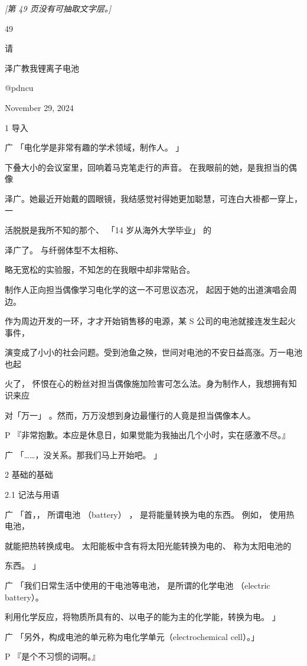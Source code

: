 \noindent\textit{[第 49 页没有可抽取文字层。]}\par

49\par
请\par
泽广教我锂离子电池\par
@pdncu\par
November 29, 2024\par
1 导入\par
广 「电化学是非常有趣的学术领域，制作人。 」\par
下叠大小的会议室里，回响着马克笔走行的声音。 在我眼前的她，是我担当的偶像\par
泽广。她最近开始戴的圆眼镜，我结感觉衬得她更加聪慧，可连白大褂都一穿上，一\par
活脱脱是我所不知的那个、 「14 岁从海外大学毕业」 的\par
泽广了。 与纤弱体型不太相称、\par
略无宽松的实验服，不知怎的在我眼中却非常贴合。\par
制作人正向担当偶像学习电化学的这一不可思议态况， 起因于她的出道演唱会周边。\par
作为周边开发的一环，才才开始销售移的电源，某 S 公司的电池就接连发生起火事件，\par
演变成了小小的社会问题。受到池鱼之殃，世间对电池的不安日益高涨。万一电池也起\par
火了， 怀恨在心的粉丝对担当偶像施加险害可怎么法。身为制作人，我想拥有知识来应\par
对「万一」 。然而，万万没想到身边最懂行的人竟是担当偶像本人。\par
P 『非常抱歉。本应是休息日，如果觉能为我抽出几个小时，实在感激不尽。』\par
广 「……，没关系。那我们马上开始吧。 」\par
2 基础的基础\par
2.1 记法与用语\par
广 「首，， 所谓电池 （battery） ， 是将能量转换为电的东西。 例如， 使用热电池，\par
就能把热转换成电。 太阳能板中含有将太阳光能转换为电的、 称为太阳电池的\par
东西。 」\par
广 「我们日常生活中使用的干电池等电池， 是所谓的化学电池 （electric battery）。\par
利用化学反应，将物质所具有的、以电子的能为主的化学能，转换为电。 」\par
广 「另外，构成电池的单元称为电化学单元（electrochemical cell）。」\par
P 『是个不习惯的词啊。』\par

